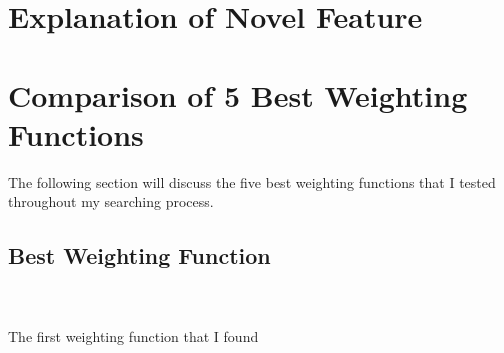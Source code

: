 \documentclass[
	12pt, %
]{fphw}
\begin{document}

\section{Explanation of Novel Feature}


\section{Comparison of 5 Best Weighting Functions}

\quad\quad The following section will discuss the five best weighting functions that I tested throughout my searching process.


\subsection{Best Weighting Function}

\hfill\\ \\  The first weighting function that I found
\end{document}
